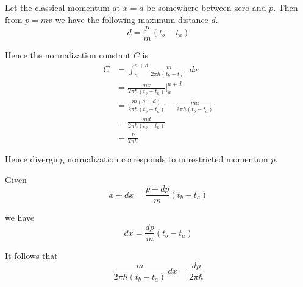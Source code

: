 \documentclass[12pt]{article}
\begin{document}
\noindent
Let the classical momentum at $x=a$ be somewhere between zero and $p$.
Then from $p=mv$ we have the following maximum distance $d$.
\begin{equation*}
d=\frac{p}{m}(t_b-t_a)
\end{equation*}

\noindent
Hence the normalization constant $C$ is
\begin{align*}
C&=\int_a^{a+d}\frac{m}{2\pi\hbar(t_b-t_a)}\,dx
\\[1ex]
&=\frac{mx}{2\pi\hbar(t_b-t_a)}\bigg|_a^{a+d}
\\[1ex]
&=\frac{m(a+d)}{2\pi\hbar(t_b-t_a)}-\frac{ma}{2\pi\hbar(t_b-t_a)}
\\[1ex]
&=\frac{md}{2\pi\hbar(t_b-t_a)}
\\[1ex]
&=\frac{p}{2\pi\hbar}
\end{align*}

\noindent
Hence diverging normalization corresponds to unrestricted momentum $p$.

\bigskip
\noindent
Given
\begin{equation*}
x+dx=\frac{p+dp}{m}(t_b-t_a)
\end{equation*}

\noindent
we have
\begin{equation*}
dx=\frac{dp}{m}(t_b-t_a)
\end{equation*}

\noindent
It follows that
\begin{equation*}
\frac{m}{2\pi\hbar(t_b-t_a)}\,dx=\frac{dp}{2\pi\hbar}
\end{equation*}
\end{document}
